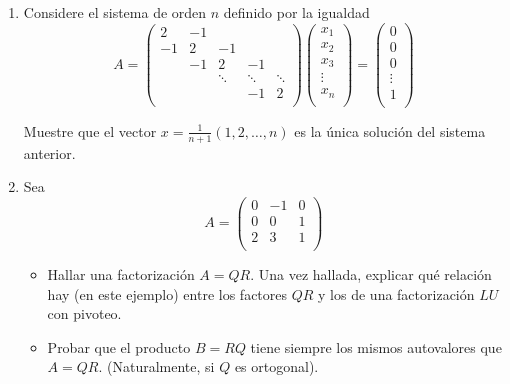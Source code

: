 \documentclass[12pt,letterpaper]{article}
\theoremstyle{plain}
\begin{document}
\begin{enumerate}
\item Considere el sistema de orden $n$ definido por la igualdad
$$
A=\left( \begin{array}{ccccc}
         2 & -1 &  &  &\\
        -1 & 2 & -1 &  &\\
           & -1 & 2 & -1 &\\
           &   & \ddots & \ddots & \ddots\\
           &   &  & -1 & 2\\
        \end{array}\right)\left(\begin{array}{c}
x_1\\
x_2\\
x_3\\
\vdots\\
x_n\\
\end{array}\right) = \left(\begin{array}{c}
0\\
0\\
0\\
\vdots\\
1\\
\end{array}\right)
$$

Muestre que el vector $x=\frac{1}{n+1}(1,2,\ldots,n)$ es la \'unica soluci\'on del sistema anterior.

\item Sea
$$
A=\left( \begin{array}{ccc}
         0 & -1 & 0 \\
         0 & 0 & 1 \\
         2 & 3 & 1 \\
        \end{array}\right)
$$
  \begin{itemize}
   \item Hallar una factorizaci\'on $A = QR$. Una vez hallada, explicar qu\'e relaci\'on hay (en este ejemplo) entre los factores $QR$ y los de una factorizaci\'on $LU$ con pivoteo.
  \item Probar que el producto $B = RQ$ tiene siempre los mismos autovalores que $A = QR$. (Naturalmente, si $Q$ es ortogonal).
  \end{itemize}


\end{enumerate}
\end{document}
